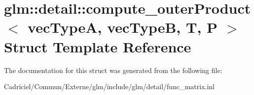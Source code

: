 \hypertarget{structglm_1_1detail_1_1compute__outer_product}{}\section{glm\+:\+:detail\+:\+:compute\+\_\+outer\+Product$<$ vec\+TypeA, vec\+TypeB, T, P $>$ Struct Template Reference}
\label{structglm_1_1detail_1_1compute__outer_product}


The documentation for this struct was generated from the following file\+:\begin{DoxyCompactItemize}
\item 
Cadriciel/\+Commun/\+Externe/glm/include/glm/detail/func\+\_\+matrix.\+inl\end{DoxyCompactItemize}
